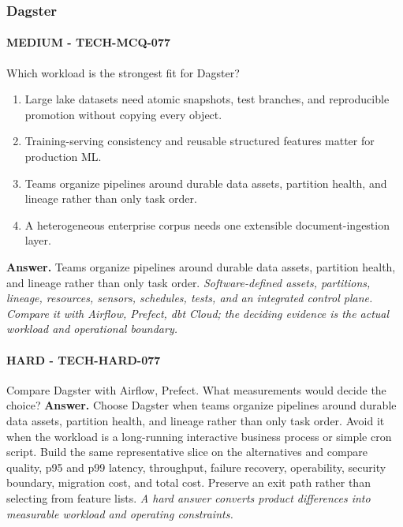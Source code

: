 \subsubsection*{Dagster}
\paragraph{MEDIUM - TECH-MCQ-077} Which workload is the strongest fit for Dagster?
\begin{enumerate}[label=\Alph*.]
\item Large lake datasets need atomic snapshots, test branches, and reproducible promotion without copying every object.
\item Training-serving consistency and reusable structured features matter for production ML.
\item Teams organize pipelines around durable data assets, partition health, and lineage rather than only task order.
\item A heterogeneous enterprise corpus needs one extensible document-ingestion layer.
\end{enumerate}
\textbf{Answer.} Teams organize pipelines around durable data assets, partition health, and lineage rather than only task order.
\textit{Software-defined assets, partitions, lineage, resources, sensors, schedules, tests, and an integrated control plane. Compare it with Airflow, Prefect, dbt Cloud; the deciding evidence is the actual workload and operational boundary.}
\paragraph{HARD - TECH-HARD-077} Compare Dagster with Airflow, Prefect. What measurements would decide the choice?
\textbf{Answer.} Choose Dagster when teams organize pipelines around durable data assets, partition health, and lineage rather than only task order. Avoid it when the workload is a long-running interactive business process or simple cron script. Build the same representative slice on the alternatives and compare quality, p95 and p99 latency, throughput, failure recovery, operability, security boundary, migration cost, and total cost. Preserve an exit path rather than selecting from feature lists.
\textit{A hard answer converts product differences into measurable workload and operating constraints.}
